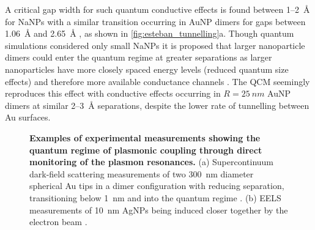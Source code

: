 \documentclass{article}
\begin{document}
A critical gap width for such quantum conductive effects is found between 1--\SI{2}{\angstrom} for NaNPs with a similar transition occurring in AuNP dimers for gaps between \SI{1.06}{\angstrom} and \SI{2.65}{\angstrom} \cite{esteban2015}, as shown in \autoref{fig:esteban_tunnelling}a. Though quantum simulations considered only small NaNPs it is proposed that larger nanoparticle dimers could enter the quantum regime at greater separations as larger nanoparticles have more closely spaced energy levels (reduced quantum size effects) and therefore more available conductance channels \cite{zuloaga2009}. The QCM seemingly reproduces this effect with conductive effects occurring in $R=\SI{25}{nm}$ AuNP dimers at similar 2--\SI{3}{\angstrom} separations, despite the lower rate of tunnelling between Au surfaces. %

\begin{figure}[bt]
\centering
{}
\caption[Examples of experimental measurements showing the quantum regime of plasmonic coupling through direct monitoring of the plasmon resonances]{\textbf{Examples of experimental measurements showing the quantum regime of plasmonic coupling through direct monitoring of the plasmon resonances.} (a) Supercontinuum dark-field scattering measurements of two \SI{300}{nm} diameter spherical Au tips in a dimer configuration with reducing separation, transitioning below \SI{1}{nm} and into the quantum regime \cite{savage2012}. (b) EELS measurements of \SI{10}{nm} AgNPs being induced closer together by the electron beam \cite{scholl2013}.}
\label{fig:tunnelling_plasmonics}
\end{figure}
\end{document}
